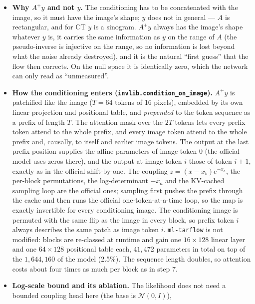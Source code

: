 \documentclass[11pt]{article}
\begin{document}
\begin{itemize}
  \item \textbf{Why $A^{+}y$ and not $y$.} The conditioning has to be
        concatenated with the image, so it must have the image's shape; $y$
        does not in general --- $A$ is rectangular, and for CT $y$ is a
        sinogram. $A^{+}y$ always has the image's shape whatever $y$ is,
        it carries the same information as $y$ on the range of $A$ (the
        pseudo-inverse is injective on the range, so no information is lost
        beyond what the noise already destroyed), and it is the natural
        ``first guess'' that the flow then corrects. On the null space it is
        identically zero, which the network can only read as ``unmeasured''.
  \item \textbf{How the conditioning enters (\texttt{invlib.condition\_on\_image}).}
        $A^{+}y$ is patchified like the image ($T = 64$ tokens of 16 pixels),
        embedded by its own linear projection and positional table, and
        \emph{prepended} to the token sequence as a prefix of length $T$. The
        attention mask over the $2T$ tokens lets every prefix token attend
        to the whole prefix, and every image token attend to the whole prefix
        and, causally, to itself and earlier image tokens. The output at the
        last prefix position supplies the affine parameters of image token 0
        (the official model uses zeros there), and the output at image token
        $i$ those of token $i+1$, exactly as in the official shift-by-one.
        The coupling $z = (x - x_b)e^{-x_a}$, the per-block permutations, the
        log-determinant $-\bar{x}_a$ and the KV-cached sampling loop are the
        official ones; sampling first pushes the prefix through the cache
        and then runs the official one-token-at-a-time loop, so the map is
        exactly invertible for every conditioning image. The conditioning
        image is permuted with the same flip as the image in every block, so
        prefix token $i$ always describes the same patch as image token $i$.
        \texttt{ml-tarflow} is not modified: blocks are re-classed at runtime
        and gain one $16 \times 128$ linear layer and one $64 \times 128$
        positional table each, $41{,}472$ parameters in total on top of the
        $1{,}644{,}160$ of the model (2.5\%). The sequence length doubles,
        so attention costs about four times as much per block as in step 7.
  \item \textbf{Log-scale bound and its ablation.} The likelihood does not
        need a bounded coupling head here (the base is $\mathcal{N}(0, I)$),

\end{itemize}
\end{document}
